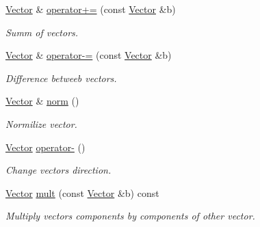 \begin{DoxyCompactItemize}
\mbox{\label{struct_vector_aadf7a93a672aa0b778c0bcdd119e1f15}} 
\mbox{\hyperlink{struct_vector}{Vector}} \& \mbox{\hyperlink{struct_vector_aadf7a93a672aa0b778c0bcdd119e1f15}{operator+=}} (const \mbox{\hyperlink{struct_vector}{Vector}} \&b)
\begin{DoxyCompactList}\small\item\em Summ of vectors. \end{DoxyCompactList}\item 
\mbox{\label{struct_vector_aa49c80222b04ee58a31ca36d8c6d8b3d}} 
\mbox{\hyperlink{struct_vector}{Vector}} \& \mbox{\hyperlink{struct_vector_aa49c80222b04ee58a31ca36d8c6d8b3d}{operator-\/=}} (const \mbox{\hyperlink{struct_vector}{Vector}} \&b)
\begin{DoxyCompactList}\small\item\em Difference betweeb vectors. \end{DoxyCompactList}\item 
\mbox{\label{struct_vector_a04db59943d78399e41abbd5a287670b9}} 
\mbox{\hyperlink{struct_vector}{Vector}} \& \mbox{\hyperlink{struct_vector_a04db59943d78399e41abbd5a287670b9}{norm}} ()
\begin{DoxyCompactList}\small\item\em Normilize vector. \end{DoxyCompactList}\item 
\mbox{\label{struct_vector_aaa5f64a3756e6294c6070b3f7c9c3b33}} 
\mbox{\hyperlink{struct_vector}{Vector}} \mbox{\hyperlink{struct_vector_aaa5f64a3756e6294c6070b3f7c9c3b33}{operator-\/}} ()
\begin{DoxyCompactList}\small\item\em Change vector\textquotesingle{}s direction. \end{DoxyCompactList}\item 
\mbox{\label{struct_vector_a1d0bab9bd03f428d4d75e78a485eab8c}} 
\mbox{\hyperlink{struct_vector}{Vector}} \mbox{\hyperlink{struct_vector_a1d0bab9bd03f428d4d75e78a485eab8c}{mult}} (const \mbox{\hyperlink{struct_vector}{Vector}} \&b) const
\begin{DoxyCompactList}\small\item\em Multiply vector\textquotesingle{}s components by components of other vector. \end{DoxyCompactList}\item 

\end{DoxyCompactItemize}
